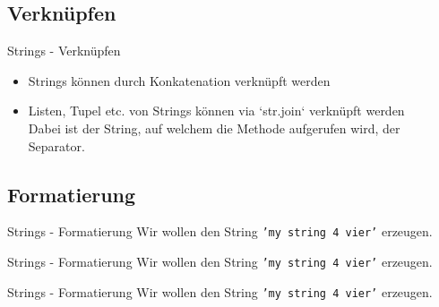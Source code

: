 \subsection{Verknüpfen}
\begin{frame}[fragile]{Strings - Verknüpfen}
	\begin{itemize}
	    \item Strings können durch Konkatenation verknüpft werden \\
	    
	    \item Listen, Tupel etc. von Strings können via `str.join` verknüpft werden \\
	    
	    Dabei ist der String, auf welchem die Methode aufgerufen wird, der Separator.
	\end{itemize}
\end{frame}


\subsection{Formatierung}
\begin{frame}[fragile]{Strings - Formatierung}
	Wir wollen den String \alert{\texttt{'my string 4 vier'}} erzeugen.

	
\end{frame}

\begin{frame}[fragile]{Strings - Formatierung}
	Wir wollen den String \alert{\texttt{'my string 4 vier'}} erzeugen.
	
\end{frame}

\begin{frame}[fragile]{Strings - Formatierung}
		Wir wollen den String \alert{\texttt{'my string 4 vier'}} erzeugen.
	
\end{frame}



